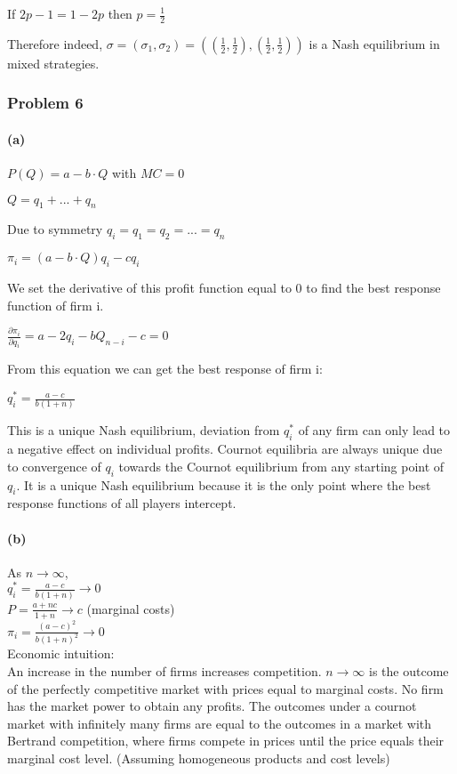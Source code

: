 \documentclass[]{article}
\let\oldparagraph\paragraph
\renewcommand{\paragraph}[1]{\oldparagraph{#1}\mbox{}}
\begin{document}
If $2p-1=1-2p$ then $p=\frac{1}{2}$

Therefore indeed, $\sigma=(\sigma_1,\sigma_2)=((\frac{1}{2},\frac{1}{2}),(\frac{1}{2},\frac{1}{2}))$ is a Nash equilibrium in mixed strategies.  

\subsubsection{Problem 6}\label{problem-6}

\paragraph{(a)}\label{a}

$P(Q)=a-b\cdot Q$ with $MC=0$

$Q=q_1+...+q_n$ 

Due to symmetry $q_i=q_1=q_2=...=q_n$

$\pi_i=(a-b\cdot Q)q_i-cq_i$

We set the derivative of this profit function equal to 0 to find the best response function of firm i.

$\frac{\partial\pi_i}{\partial q_i}=a-2q_i-bQ_{n-i}-c=0$

From this equation we can get the best response of firm i:

$q_i^*=\frac{a-c}{b(1+n)}$

This is a unique Nash equilibrium, deviation from $q_i^*$ of any firm can only lead to a negative effect on individual profits. Cournot equilibria are always unique due to convergence of $q_i$ towards the Cournot equilibrium from any starting point of $q_i$. It is a unique Nash equilibrium because it is the only point where the best response functions of all players intercept.

\paragraph{(b)}

As $n\rightarrow\infty$, \\
$q_i^*=\frac{a-c}{b(1+n)}\rightarrow 0$\\
$P=\frac{a+nc}{1+n}\rightarrow c$    (marginal costs)\\
$\pi_i=\frac{(a-c)^2}{b(1+n)^2}\rightarrow 0$ \\

Economic intuition:\\
An increase in the number of firms increases competition. $n\rightarrow\infty$ is the outcome of the perfectly competitive market with prices equal to marginal costs. No firm has the market power to obtain any profits. 
The outcomes under a cournot market with infinitely many firms are equal to the outcomes in a market with Bertrand competition, where firms compete in prices until the price equals their marginal cost level. (Assuming homogeneous products and cost levels) 
\end{document}
